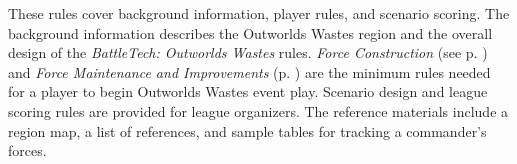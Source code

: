 These rules cover background information, player rules, and scenario scoring.
The background information describes the Outworlds Wastes region and the overall design of the \emph{BattleTech: Outworlds Wastes} rules.
\emph{Force Construction} (see p. \pageref{subsec:force_construction}) and \emph{Force Maintenance and Improvements} (p. \pageref{subsec:force_maintenance}) are the minimum rules needed for a player to begin Outworlds Wastes event play.
Scenario design and league scoring rules are provided for league organizers.
The reference materials include a region map, a list of references, and sample tables for tracking a commander's forces.
